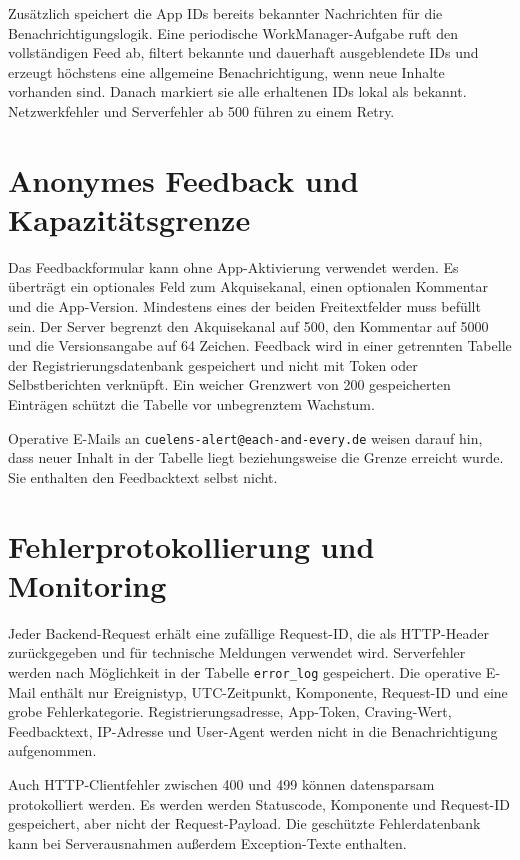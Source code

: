 Zusätzlich speichert die App IDs bereits bekannter Nachrichten für die Benachrichtigungslogik. Eine periodische WorkManager-Aufgabe ruft den vollständigen Feed ab, filtert bekannte und dauerhaft ausgeblendete IDs und erzeugt höchstens eine allgemeine Benachrichtigung, wenn neue Inhalte vorhanden sind. Danach markiert sie alle erhaltenen IDs lokal als bekannt. Netzwerkfehler und Serverfehler ab 500 führen zu einem Retry.

\section{Anonymes Feedback und Kapazitätsgrenze}

Das Feedbackformular kann ohne App-Aktivierung verwendet werden. Es überträgt ein optionales Feld zum Akquisekanal, einen optionalen Kommentar und die App-Version. Mindestens eines der beiden Freitextfelder muss befüllt sein. Der Server begrenzt den Akquisekanal auf 500, den Kommentar auf 5000 und die Versionsangabe auf 64 Zeichen. Feedback wird in einer getrennten Tabelle der Registrierungsdatenbank gespeichert und nicht mit Token oder Selbstberichten verknüpft. Ein weicher Grenzwert von 200 gespeicherten Einträgen schützt die Tabelle vor unbegrenztem Wachstum. 

Operative E-Mails an \texttt{cuelens-alert@each-and-every.de} weisen darauf hin, dass neuer Inhalt in der Tabelle liegt beziehungsweise die Grenze erreicht wurde. Sie enthalten den Feedbacktext selbst nicht.

\section{Fehlerprotokollierung und Monitoring}

Jeder Backend-Request erhält eine zufällige Request-ID, die als HTTP-Header zurückgegeben und für technische Meldungen verwendet wird. Serverfehler werden nach Möglichkeit in der Tabelle \texttt{error\_log} gespeichert. Die operative E-Mail enthält nur Ereignistyp, UTC-Zeitpunkt, Komponente, Request-ID und eine grobe Fehlerkategorie. Registrierungsadresse, App-Token, Craving-Wert, Feedbacktext, IP-Adresse und User-Agent werden nicht in die Benachrichtigung aufgenommen.

Auch HTTP-Clientfehler zwischen 400 und 499 können datensparsam protokolliert werden. Es werden werden Statuscode, Komponente und Request-ID gespeichert, aber nicht der Request-Payload. Die geschützte Fehlerdatenbank kann bei Serverausnahmen außerdem Exception-Texte enthalten.

